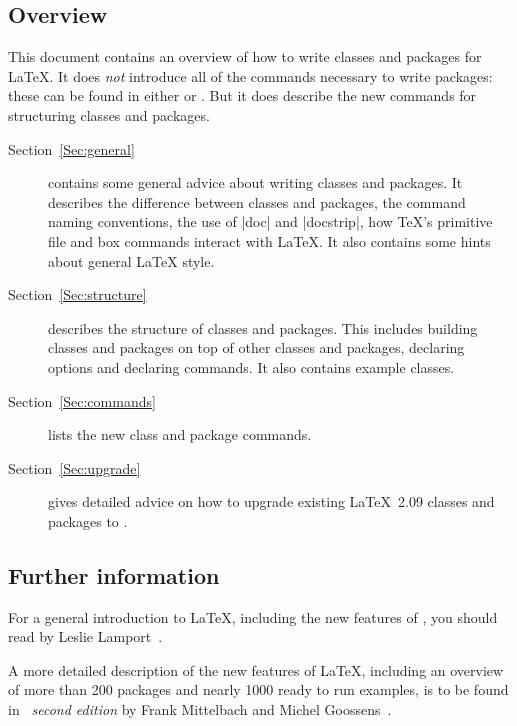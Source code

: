 \documentclass[11pt]{ltxguide}[1995/11/28]
\begin{document}
\subsection{Overview}

This document contains an overview of how to write classes and
packages for \LaTeX{}.  It does \emph{not} introduce all of the
commands necessary to write packages: these can be found in either
\emph{\LaTeXbook} or \emph{\LaTeXcomp}.  But it does describe the new
commands for structuring classes and packages.

\begin{description}

\item[Section~\ref{Sec:general}] contains some general advice about
  writing classes and packages.  It describes the difference between
  classes and packages, the command naming conventions, the use of
  |doc| and |docstrip|, how \TeX's primitive file and box commands
  interact with \LaTeX{}. It also contains some hints about general
  \LaTeX{} style.

\item[Section~\ref{Sec:structure}] describes the structure of classes
  and packages.  This includes building classes and packages on top of
  other classes and packages, declaring options and declaring
  commands.  It also contains example classes.

\item[Section~\ref{Sec:commands}] lists the new class and package
   commands.

 \item[Section~\ref{Sec:upgrade}] gives detailed advice on how to
   upgrade existing \LaTeX~2.09 classes and packages to \LaTeXe{}.

\end{description}

\subsection{Further information}

For a general introduction to \LaTeX{}, including the new features of
\LaTeXe{}, you should read \emph{\LaTeXbook}
by Leslie Lamport~\cite{A-W:LLa94}.

A more detailed description of the new features of \LaTeX, including an
overview of more than 200 packages and nearly 1000 ready to run examples, is
to be found in \emph{\LaTeXcomp\ second edition} by Frank Mittelbach and
Michel Goossens~\cite{A-W:MG2004}.
\end{document}
